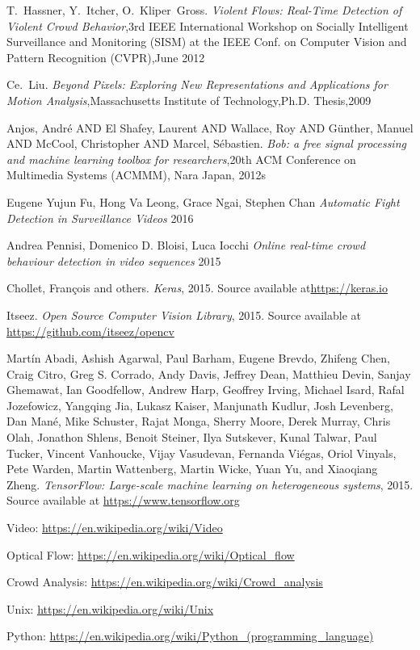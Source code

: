 \cleardoublepage
{}
{}
\begin{thebibliography}{99}

T.~Hassner, Y.~Itcher, O.~Kliper~Gross. \emph{Violent Flows: Real-Time Detection of Violent Crowd Behavior},3rd IEEE International Workshop on Socially Intelligent Surveillance and Monitoring (SISM) at the IEEE Conf. on Computer Vision and Pattern Recognition (CVPR),June 2012

Ce.~Liu. \emph{Beyond Pixels: Exploring New Representations and Applications for Motion Analysis},Massachusetts Institute of Technology,Ph.D. Thesis,2009

Anjos, Andr\'e AND El Shafey, Laurent AND Wallace, Roy AND G\"unther, Manuel AND McCool, Christopher AND Marcel, S\'ebastien. \emph{Bob: a free signal processing and machine learning toolbox for researchers},20th ACM Conference on Multimedia Systems (ACMMM), Nara Japan, 2012s

Eugene Yujun Fu, Hong Va Leong, Grace Ngai, Stephen Chan \emph{Automatic Fight Detection in Surveillance Videos} 2016

Andrea Pennisi, Domenico D. Bloisi, Luca Iocchi \emph{Online real-time crowd behaviour detection in video sequences} 2015

Chollet, Fran\c{c}ois and others. \emph{Keras}, 2015. Source available at\url{https://keras.io}

Itseez. \emph{Open Source Computer Vision Library}, 2015. Source available at \url{https://github.com/itseez/opencv}

Martín Abadi, Ashish Agarwal, Paul Barham, Eugene Brevdo,
Zhifeng Chen, Craig Citro, Greg S. Corrado, Andy Davis,
Jeffrey Dean, Matthieu Devin, Sanjay Ghemawat, Ian Goodfellow,
Andrew Harp, Geoffrey Irving, Michael Isard, Rafal Jozefowicz, Yangqing Jia,
Lukasz Kaiser, Manjunath Kudlur, Josh Levenberg, Dan Mané, Mike Schuster,
Rajat Monga, Sherry Moore, Derek Murray, Chris Olah, Jonathon Shlens,
Benoit Steiner, Ilya Sutskever, Kunal Talwar, Paul Tucker,
Vincent Vanhoucke, Vijay Vasudevan, Fernanda Viégas,
Oriol Vinyals, Pete Warden, Martin Wattenberg, Martin Wicke,
Yuan Yu, and Xiaoqiang Zheng.
\emph{TensorFlow: Large-scale machine learning on heterogeneous systems}, 2015. Source available at \url{ https://www.tensorflow.org}

Video: \url{https://en.wikipedia.org/wiki/Video}

Optical Flow: \url{https://en.wikipedia.org/wiki/Optical_flow}

Crowd Analysis: \url{https://en.wikipedia.org/wiki/Crowd_analysis}

Unix: \url{https://en.wikipedia.org/wiki/Unix}

Python: \url{https://en.wikipedia.org/wiki/Python_(programming_language)}





\end{thebibliography}
